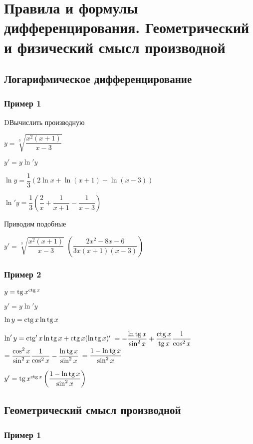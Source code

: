 \section{Правила и формулы дифференцирования. Геометрический и физический смысл производной}

\subsection{Логарифмическое дифференцирование}

\subsubsection{Пример 1}

DВычислить производную

$ y = \sqrt[3]{ \dfrac{x^{2}( x+1 )}{ x-3 } } $

$ y' = y \ln' y $

$ \ln y = \dfrac{1}{3} 
\left(
2 \ln x + \ln(x+1) - \ln(x-3)
\right)  $

$ \ln' y = \dfrac{1}{3} 
\left(
\dfrac{2}{x} + \dfrac{1}{x+1} - \dfrac{1}{x-3}
\right)  $

Приводим подобные

$ y' = \sqrt[3]{ \dfrac{x^{2}( x+1 )}{ x-3 } } $
$ \left( \dfrac{2x^{2} - 8x - 6}{3x(x+1)(x-3)} \right)  $

\subsubsection{Пример 2}

$ y = \operatorname{tg} x^{\operatorname{ctg} x}$

$ y' = y \ln' y $

$  \ln y = \operatorname{ctg} x \ln \operatorname{tg} x $

$  \ln' y = \operatorname{ctg}' x \ln \operatorname{tg} x + \operatorname{ctg} x (\ln \operatorname{tg} x)' $
$ = -\dfrac{\ln \operatorname{tg} x}{\sin^{2} x} +\dfrac{ \operatorname{ctg} x}{\operatorname{tg} x} \dfrac{1}{\cos^{2} x} $
$ = \dfrac{ \cos^{2} x}{\sin^{2} x} \dfrac{1}{\cos^{2} x} - \dfrac{\ln \operatorname{tg} x}{\sin^{2} x} $
$ = \dfrac{1 - \ln \operatorname{tg} x}{\sin^{2} x} $

$ y' = \operatorname{tg} x^{\operatorname{ctg} x} \left( \dfrac{1 - \ln \operatorname{tg} x}{\sin^{2} x} \right)  $

\subsection{Геометрический смысл производной}

\subsubsection{Пример 1}

